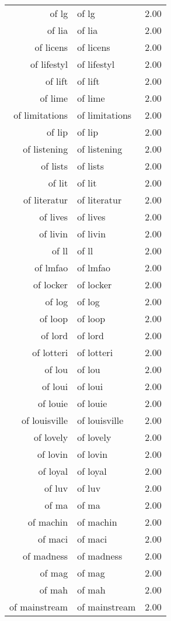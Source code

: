 \begin{table}[ht]
\begin{tabular}{rlr}
  of lg & of lg & 2.00 \\ 
  of lia & of lia & 2.00 \\ 
  of licens & of licens & 2.00 \\ 
  of lifestyl & of lifestyl & 2.00 \\ 
  of lift & of lift & 2.00 \\ 
  of lime & of lime & 2.00 \\ 
  of limitations & of limitations & 2.00 \\ 
  of lip & of lip & 2.00 \\ 
  of listening & of listening & 2.00 \\ 
  of lists & of lists & 2.00 \\ 
  of lit & of lit & 2.00 \\ 
  of literatur & of literatur & 2.00 \\ 
  of lives & of lives & 2.00 \\ 
  of livin & of livin & 2.00 \\ 
  of ll & of ll & 2.00 \\ 
  of lmfao & of lmfao & 2.00 \\ 
  of locker & of locker & 2.00 \\ 
  of log & of log & 2.00 \\ 
  of loop & of loop & 2.00 \\ 
  of lord & of lord & 2.00 \\ 
  of lotteri & of lotteri & 2.00 \\ 
  of lou & of lou & 2.00 \\ 
  of loui & of loui & 2.00 \\ 
  of louie & of louie & 2.00 \\ 
  of louisville & of louisville & 2.00 \\ 
  of lovely & of lovely & 2.00 \\ 
  of lovin & of lovin & 2.00 \\ 
  of loyal & of loyal & 2.00 \\ 
  of luv & of luv & 2.00 \\ 
  of ma & of ma & 2.00 \\ 
  of machin & of machin & 2.00 \\ 
  of maci & of maci & 2.00 \\ 
  of madness & of madness & 2.00 \\ 
  of mag & of mag & 2.00 \\ 
  of mah & of mah & 2.00 \\ 
  of mainstream & of mainstream & 2.00 \\ 

\end{tabular}
\end{table}
